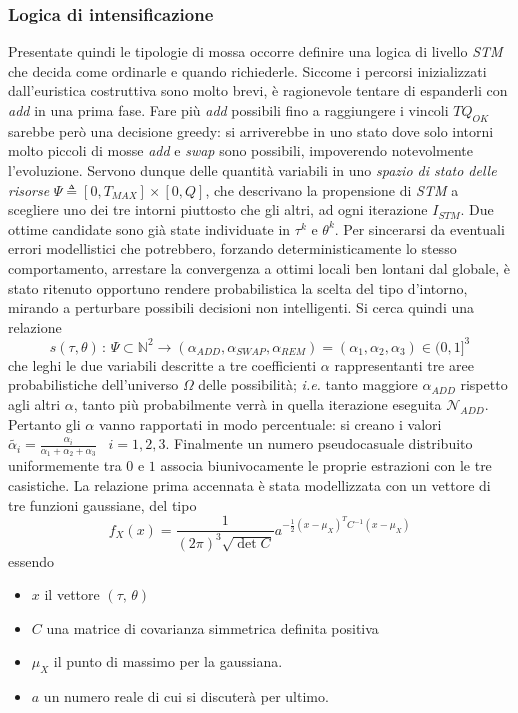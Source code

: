 \subsubsection{Logica di intensificazione} %
	Presentate quindi le tipologie di mossa occorre definire una logica di livello \emph{STM} che decida come ordinarle e quando richiederle.
	Siccome i percorsi inizializzati dall'euristica costruttiva sono molto brevi, è
	ragionevole tentare di espanderli con \emph{add} in una prima fase.
	Fare più \emph{add} possibili fino a raggiungere i vincoli $TQ_{OK}$ sarebbe però una decisione greedy: si arriverebbe in uno stato dove solo intorni molto piccoli di mosse \emph{add} e \emph{swap} sono possibili, impoverendo notevolmente l'evoluzione.
	Servono dunque delle quantità variabili in uno \emph{spazio di stato delle risorse} $\Psi \triangleq [0,T_{MAX}]\times[0,Q]$, che descrivano 
	la propensione di \emph{STM} a scegliere uno dei tre intorni piuttosto che gli altri, ad ogni iterazione $I_{STM}$. Due ottime candidate sono già state 
	individuate in $\tau^k$ e $\theta^k$.  
	Per sincerarsi da eventuali errori modellistici che potrebbero, forzando deterministicamente lo stesso comportamento, arrestare la convergenza 
	a ottimi locali ben lontani dal globale, è stato ritenuto opportuno rendere probabilistica la scelta del tipo d'intorno, mirando a perturbare 
	possibili decisioni non intelligenti.
	Si cerca quindi una relazione $$ s(\tau,\theta) \, : \,\Psi \subset \mathbb{N}^2 \rightarrow 
	(\alpha_{ADD},\alpha_{SWAP},\alpha_{REM}) = (\alpha_1,\alpha_2,\alpha_3)\in(0,1]^3$$ 
	che leghi le due variabili descritte a tre coefficienti $\alpha$ rappresentanti tre aree probabilistiche dell'universo $\Omega$ delle possibilità; 
	\emph{i.e.} tanto maggiore $\alpha_{ADD}$ rispetto agli altri $\alpha$, tanto più probabilmente verrà in quella iterazione eseguita $\mathcal{N}_{ADD}$.
	Pertanto gli $\alpha$ vanno rapportati in modo percentuale: si creano i valori $\tilde{\alpha_i}=\frac{\alpha_i}{\alpha_1+\alpha_2+\alpha_3}\;\;\; i=1,2,3$.
	Finalmente un numero pseudocasuale distribuito uniformemente tra $0$ e $1$ associa biunivocamente le proprie estrazioni con le tre casistiche.
	La relazione prima accennata è stata modellizzata con un vettore di tre funzioni gaussiane, del tipo
	$$f_X(x) = \frac{1}{{(2\pi)}^3\sqrt{\det C}}a^{-\frac{1}{2}{(x-\mu_X)}^TC^{-1}(x-\mu_X)} $$
	essendo \begin{itemize}
	  \item $x$ il vettore $(\tau,\,\theta)$
	  \item $C$ una matrice di covarianza simmetrica definita positiva
	  \item $\mu_X$ il punto di massimo per la gaussiana.
	  \item $a$ un numero reale di cui si discuterà per ultimo.
	\end{itemize}
